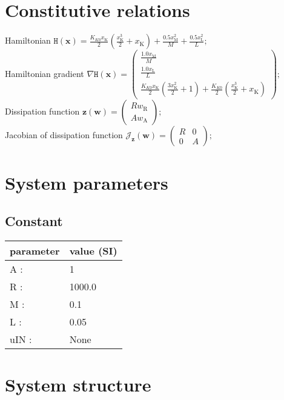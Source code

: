 \documentclass[11pt, oneside]{article}      %
\begin{document}
\section{Constitutive relations}
%
Hamiltonian $ \mathtt{H}(\mathbf{x}) = \frac{K_{K0} x_{\mathrm{K}}}{2} \left(\frac{x_{\mathrm{K}}^{3}}{2} + x_{\mathrm{K}}\right) + \frac{0.5 x_{\mathrm{M}}^{2}}{M} + \frac{0.5 x_{\mathrm{L}}^{2}}{L} ; $ 
%
\\
%
Hamiltonian gradient $ \nabla \mathtt{H}(\mathbf{x}) = \left(\begin{array}{c}\frac{1.0 x_{\mathrm{M}}}{M}\\\frac{1.0 x_{\mathrm{L}}}{L}\\\frac{K_{K0} x_{\mathrm{K}}}{2} \left(\frac{3 x_{\mathrm{K}}^{2}}{2} + 1\right) + \frac{K_{K0}}{2} \left(\frac{x_{\mathrm{K}}^{3}}{2} + x_{\mathrm{K}}\right)\end{array}\right) ; $ 
%
\\
%
Dissipation function $ \mathbf{z}(\mathbf{w}) = \left(\begin{array}{c}R w_{\mathrm{R}}\\A w_{\mathrm{A}}\end{array}\right) ; $ 
%
\\
%
Jacobian of dissipation function $ \mathcal{J}_{\mathbf{z}}(\mathbf{w}) = \left(\begin{array}{cc}R & 0\\0 & A\end{array}\right) ; $ 
%
\\
%
%
\section{System parameters}
%
%
\subsection{Constant}
%
\begin{center}
%
\begin{tabular}{ll}
%
\hline
parameter & value (SI)
\\ \hline
A :& 1
\\
R :& 1000.0
\\
M :& 0.1
\\
L :& 0.05
\\
uIN :& None
\\
\hline
\end{tabular}
%
\end{center}
%
\section{System structure}
%
\end{document}
